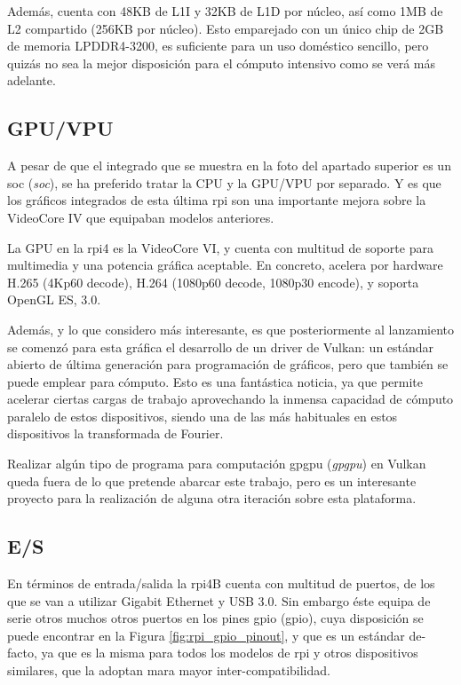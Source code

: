 Además, cuenta con 48KB de L1I y 32KB de L1D por núcleo, así como 1MB de L2 compartido (256KB por núcleo). Esto emparejado con un único chip de 2GB de memoria LPDDR4-3200, es suficiente para un uso doméstico sencillo, pero quizás no sea la mejor disposición para el cómputo intensivo como se verá más adelante.

\subsection{GPU/VPU}
A pesar de que el integrado que se muestra en la foto del apartado superior es un \acrshort{soc} (\textit{\acrlong{soc}}), se ha preferido tratar la CPU y la GPU/VPU por separado. Y es que los gráficos integrados de esta última \acrlong{rpi} son una importante mejora sobre la VideoCore IV que equipaban modelos anteriores.

La GPU en la \acrshort{rpi}4 es la VideoCore VI, y cuenta con multitud de soporte para multimedia y una potencia gráfica aceptable. En concreto, acelera por hardware H.265 (4Kp60 decode), H.264 (1080p60 decode, 1080p30 encode), y soporta OpenGL ES, 3.0.

Además, y lo que considero más interesante, es que posteriormente al lanzamiento se comenzó para esta gráfica el desarrollo de un driver de Vulkan: un estándar abierto de última generación para programación de gráficos, pero que también se puede emplear para cómputo. Esto es una fantástica noticia, ya que permite acelerar ciertas cargas de trabajo aprovechando la inmensa capacidad de cómputo paralelo de estos dispositivos, siendo una de las más habituales en estos dispositivos la transformada de Fourier.

Realizar algún tipo de programa para computación \acrshort{gpgpu} (\textit{\acrlong{gpgpu}}) en Vulkan queda fuera de lo que pretende abarcar este trabajo, pero es un interesante proyecto para la realización de alguna otra iteración sobre esta plataforma.

\subsection{E/S}
En términos de entrada/salida la \acrshort{rpi}4B cuenta con multitud de puertos, de los que se van a utilizar Gigabit Ethernet y USB 3.0. Sin embargo éste equipa de serie otros muchos otros puertos en los pines \acrshort{gpio} (\acrlong{gpio}), cuya disposición se puede encontrar en la Figura \ref{fig:rpi_gpio_pinout}, y que es un estándar de-facto, ya que es la misma para todos los modelos de \acrlong{rpi} y otros dispositivos similares, que la adoptan mara mayor inter-compatibilidad.

